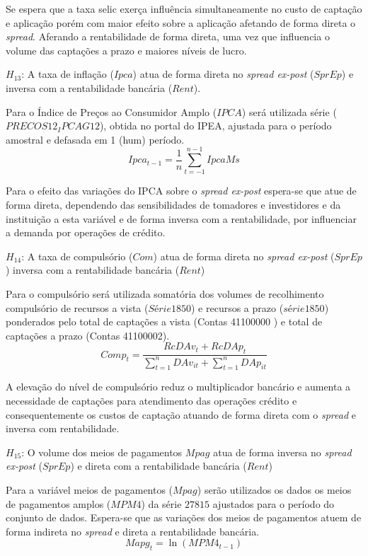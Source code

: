 \documentclass[12pt,12pt,openright,oneside,a4paper,chapter=TITLE,section=TITLE,subsection=TITLE,subsubsection=TITLE,english,french,spanish,portugues,sumario=tradicional]{abntex2}
\begin{document}
Se espera que a taxa selic exerça influência simultaneamente no custo de captação e aplicação porém com maior efeito sobre a aplicação afetando de forma direta o \emph{spread}. Aferando a rentabilidade de forma direta, uma vez que influencia o volume das captações a prazo e maiores níveis de lucro.

\(H_{13}\): A taxa de inflação (\(Ipca\)) atua de forma direta no \emph{spread ex-post} (\(SprEp\)) e inversa com a rentabilidade bancária (\(Rent\)).

Para o Índice de Preços ao Consumidor Amplo (\(IPCA\)) será utilizada série (\(PRECOS12_IPCAG12\)), obtida no portal do IPEA, ajustada para o período amostral e defasada em 1 (hum) período.
\[
Ipca_{t-1} = \frac{1}{n}\sum_{t=-1}^{n-1}IpcaMs
\]

Para o efeito das variações do IPCA sobre o \emph{spread ex-post} espera-se que atue de forma direta, dependendo das sensibilidades de tomadores e investidores e da instituição a esta variável e de forma inversa com a rentabilidade, por influenciar a demanda por operações de crédito.

\(H_{14}\): A taxa de compulsório (\(Com\)) atua de forma direta no \emph{spread ex-post} (\(SprEp\)) inversa com a rentabilidade bancária (\(Rent\))

Para o compulsório será utilizada somatória dos volumes de recolhimento compulsório de recursos a vista (\(Série 1850\)) e recursos a prazo (\(série 1850\)) ponderados pelo total de captações a vista (Contas 41100000 ) e total de captações a prazo (Contas 41100002).
\[
Comp_{t} = \frac{RcDAv_{t} + RcDAp_{t}}{\sum_{t=1}^{n}DAv_{it} + \sum_{t=1}^{n}DAp_{it}}
\]

A elevação do nível de compulsório reduz o multiplicador bancário e aumenta a necessidade de captações para atendimento das operações crédito e consequentemente os custos de captação atuando de forma direta com o \emph{spread} e inversa com rentabilidade.

\(H_{15}\): O volume dos meios de pagamentos \(Mpag\) atua de forma inversa no \emph{spread ex-post} (\(SprEp\)) e direta com a rentabilidade bancária (\(Rent\))

Para a variável meios de pagamentos (\(Mpag\)) serão utilizados os dados os meios de pagamentos amplos (\(MPM4\)) da série \(27815\) ajustados para o período do conjunto de dados. Espera-se que as variações dos meios de pagamentos atuem de forma indireta no \emph{spread} e direta a rentabilidade bancária.
\[
Mapg_{t} = \ln(MPM4_{t-1})
\]
\end{document}
